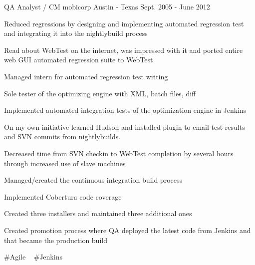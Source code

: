 \begin{cventries}
  \cventry
    {QA Analyst / CM} %
    {mobicorp} %
    {Austin - Texas} %
    {Sept. 2005 - June 2012} %
    {
      \begin{cvitems} %
        \item {Reduced regressions by designing and implementing automated regression test and integrating it into the nightlybuild process}
        \item {Read about WebTest on the internet, was impressed with it and ported entire web GUI automated regression suite to WebTest}
        \item {Managed intern for automated regression test writing}
        \item {Sole tester of the optimizing engine with XML, batch files, diff}
        \item {Implemented automated integration tests of the optimization engine in Jenkins}
        \item {On my own initiative learned Hudson and installed plugin to email test results and SVN commits from nightlybuilds.}
        \item {Decreased time from SVN checkin to WebTest completion by several hours through increased use of slave machines}
        \item {Managed/created the continuous integration build process}
        \item {Implemented Cobertura code coverage}
        \item {Created three installers and maintained three additional ones}
        \item {Created promotion process where QA deployed the latest code from Jenkins and that became the production build}
      \end{cvitems}
    }
    {
      \#Agile ~
      \#Jenkins ~
    }

\end{cventries}
